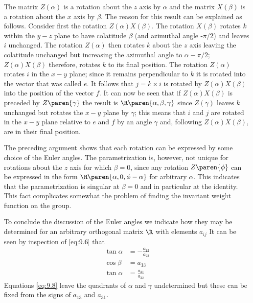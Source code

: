 The matrix $Z(\alpha)$ is a rotation about the $z$ axis by $\alpha$ and the matrix $X(\beta)$ is a rotation about the $x$ axis by $\beta$.	The reason for this result can be explained as follows.	Consider first the rotation $Z(\alpha)X(\beta)$. The rotation $X(\beta)$ rotates $k$ within the $y-z$ plane to have colatitude $\beta$
(and azimuthal angle -$\pi$/2) and leaves $i$ unchanged. The rotation $Z(\alpha)$ then rotates $k$ about the $z$ axis leaving the colatitude unchanged but increasing the azimuthal angle to $\alpha-\pi/2$; $Z(\alpha)X(\beta)$ therefore, rotates $k$ to its final position. The rotation $Z(\alpha)$ rotates $i$ in the $x-y$ plane; since it remains perpendicular to $k$ it is rotated into the vector that was called $e$. It follows that $j = k \times i$ is rotated by $Z(\alpha)X(\beta)$ into the position of the vector $f$. It can now be seen that if $Z(\alpha)X(\beta)$ is preceded by $Z\paren{\gamma}$ the result is $\R\paren{\alpha, \beta, \gamma}$ since $Z(\gamma)$ leaves $k$ unchanged but rotates the $x-y$ plane by $\gamma$; this means that $i$ and $j$ are rotated in the $x-y$ plane relative to $e$ and $f$ by an angle $\gamma$ and, following $Z(\alpha)X(\beta)$, are in their final position.

The preceding argument shows that each rotation can be expressed by some choice of the Euler angles. The parametrization is, however, not unique for rotations about the $z$ axis for which $\beta = 0$, since
any rotation $Z\paren{\phi} $ can be expressed in the form $\R \paren{\alpha, 0, \phi - \alpha} $ for arbitrary $\alpha$. This indicates that the parametrization is singular at $\beta = 0$ and in particular at the identity. This fact complicates somewhat the problem of finding the invariant weight function on the group.

To conclude the discussion of the Euler angles we indicate how they may be determined for an arbitrary orthogonal matrix  $\R$ with elements $a_{ij}$ It can be seen by inspection of \eqref{eq:9.6} that
\begin{subequations}
\label{eq:9.8} 
\begin{align} 
%
\tan \alpha &= -\frac{a_{13}}{a_{23}} \\ 
%
\cos \beta  &= a_{33} \\ 
%
\tan \alpha &= \frac{a_{31}}{a_{32}}
%
\end{align}
\end{subequations}
Equations \eqref{eq:9.8} leave the quadrants of $\alpha$ and $\gamma$ undetermined but these can be fixed from the signs of $a_{13}$ and $a_{31}$.

